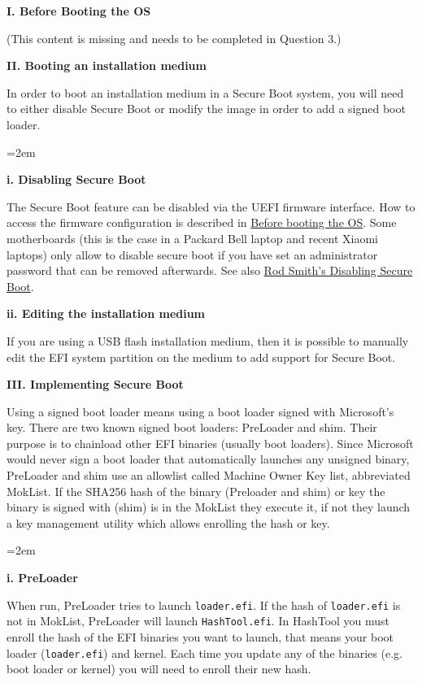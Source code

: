 \documentclass{exam-zh}
\begin{document}
\textbf{I. Before Booting the OS}

(This content is missing and needs to be completed in Question 3.)

\textbf{II. Booting an installation medium}

In order to boot an installation medium in a Secure Boot system, you will need to either disable Secure Boot or modify the image in order to add a signed boot loader.

\begingroup
\leftskip=2em

\textbf{i. Disabling Secure Boot}

The Secure Boot feature can be disabled via the UEFI firmware interface. How to access the firmware configuration is described in \underline{Before booting the OS}. Some motherboards (this is the case in a Packard Bell laptop and recent Xiaomi laptops) only allow to disable secure boot if you have set an administrator password that can be removed afterwards. See also \underline{Rod Smith's Disabling Secure Boot}.

\textbf{ii. Editing the installation medium}

If you are using a USB flash installation medium, then it is possible to manually edit the EFI system partition on the medium to add support for Secure Boot.

\par
\endgroup

\textbf{III. Implementing Secure Boot}

Using a signed boot loader means using a boot loader signed with Microsoft's key. There are two known signed boot loaders: PreLoader and shim. Their purpose is to chainload other EFI binaries (usually boot loaders). Since Microsoft would never sign a boot loader that automatically launches any unsigned binary, PreLoader and shim use an allowlist called Machine Owner Key list, abbreviated MokList. If the SHA256 hash of the binary (Preloader and shim) or key the binary is signed with (shim) is in the MokList they execute it, if not they launch a key management utility which allows enrolling the hash or key.

\begingroup
\leftskip=2em

\textbf{i. PreLoader}

When run, PreLoader tries to launch \texttt{loader.efi}. If the hash of \texttt{loader.efi} is not in MokList, PreLoader will launch \texttt{HashTool.efi}. In HashTool you must enroll the hash of the EFI binaries you want to launch, that means your boot loader (\texttt{loader.efi}) and kernel. Each time you update any of the binaries (e.g. boot loader or kernel) you will need to enroll their new hash.
\end{document}
